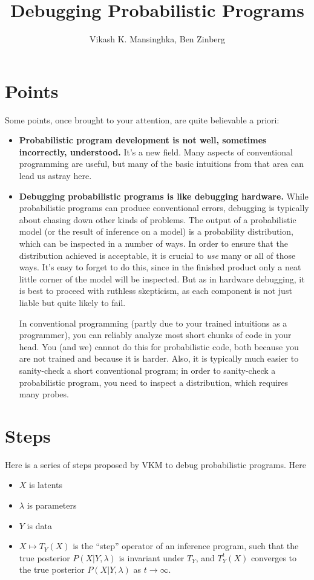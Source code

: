 \documentclass[11pt]{article}
\title{Debugging Probabilistic Programs}
\author{Vikash K. Mansinghka, Ben Zinberg}
\begin{document}
\maketitle

\section{Points}

Some points, once brought to your attention, are quite believable a priori:

\begin{itemize}
  \item {\bf Probabilistic program development is not well, sometimes
    incorrectly, understood.}  It's a new field.  Many aspects of conventional
    programming are useful, but many of the basic intuitions from that area can
    lead us astray here.

  \item {\bf Debugging probabilistic programs is like debugging hardware.} While
    probabilistic programs can produce conventional errors, debugging is
    typically about chasing down other kinds of problems.  The output of a
    probabilistic model (or the result of inference on a model) is a probability
    distribution, which can be inspected in a number of ways.  In order to
    ensure that the distribution achieved is acceptable, it is crucial to {\em
    use} many or all of those ways.  It's easy to forget to do this, since in
    the finished product only a neat little corner of the model will be
    inspected.  But as in hardware debugging, it is best to proceed with
    ruthless skepticism, as each component is not just liable but quite likely
    to fail.
    
    In conventional programming (partly due to your trained intuitions as a
    programmer), you can reliably analyze most short chunks of code in your
    head.  You (and we) cannot do this for probabilistic code, both because you
    are not trained and because it is harder.  Also, it is typically much easier
    to sanity-check a short conventional program; in order to sanity-check a
    probabilistic program, you need to inspect a distribution, which requires
    many probes.
\end{itemize}

\section{Steps}

Here is a series of steps proposed by VKM to debug probabilistic programs.  Here
\begin{itemize}[noitemsep]
  \item $X$ is latents
  \item $\lambda$ is parameters
  \item $Y$ is data
  \item $X \mapsto T_Y(X)$ is the ``step'' operator of an inference program,
    such that the true posterior $P(X|Y,\lambda)$ is invariant under $T_Y$, and
    $T_Y^t(X)$ converges to the true posterior $P(X|Y,\lambda)$ as $t \to
    \infty$.
\end{itemize}
\end{document}

